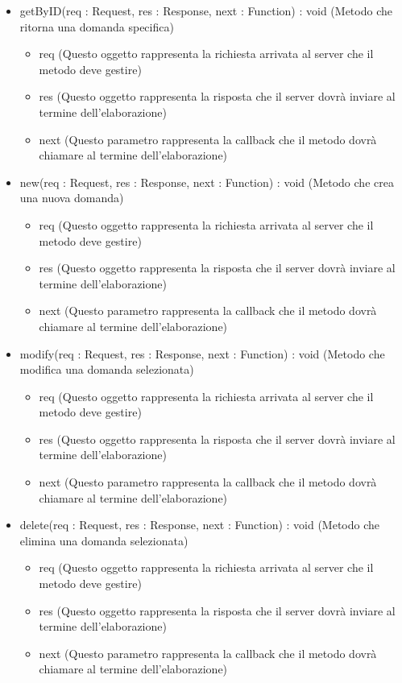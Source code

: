 \begin{description}
\begin{itemize}
\item getByID(req : Request, res : Response, next : Function) : void (Metodo che ritorna una domanda specifica)\begin{itemize}
\item req (Questo oggetto rappresenta la richiesta arrivata al server che il metodo deve gestire)
\item res (Questo oggetto rappresenta la risposta che il server dovrà inviare al termine dell'elaborazione)
\item next (Questo parametro rappresenta la callback che il metodo dovrà chiamare al termine dell’elaborazione)
\end{itemize}

\item new(req : Request, res : Response, next : Function) : void (Metodo che crea una nuova domanda)\begin{itemize}
\item req (Questo oggetto rappresenta la richiesta arrivata al server che il metodo deve gestire)
\item res (Questo oggetto rappresenta la risposta che il server dovrà inviare al termine dell'elaborazione)
\item next (Questo parametro rappresenta la callback che il metodo dovrà chiamare al termine dell’elaborazione)
\end{itemize}

\item modify(req : Request, res : Response, next : Function) : void (Metodo che modifica una domanda selezionata)\begin{itemize}
\item req (Questo oggetto rappresenta la richiesta arrivata al server che il metodo deve gestire)
\item res (Questo oggetto rappresenta la risposta che il server dovrà inviare al termine dell'elaborazione)
\item next (Questo parametro rappresenta la callback che il metodo dovrà chiamare al termine dell’elaborazione)
\end{itemize}

\item delete(req : Request, res : Response, next : Function) : void (Metodo che elimina una domanda selezionata)\begin{itemize}
\item req (Questo oggetto rappresenta la richiesta arrivata al server che il metodo deve gestire)
\item res (Questo oggetto rappresenta la risposta che il server dovrà inviare al termine dell'elaborazione)
\item next (Questo parametro rappresenta la callback che il metodo dovrà chiamare al termine dell’elaborazione)
\end{itemize}

\end{itemize}

\end{description}

